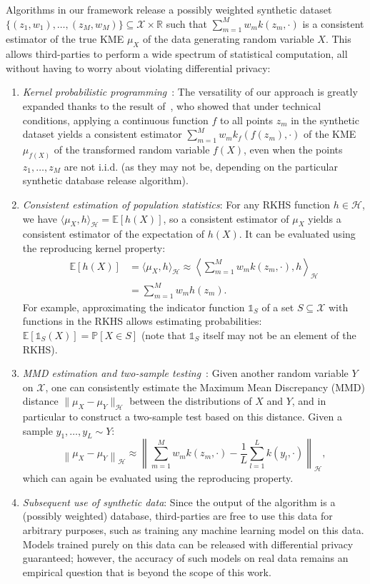 \documentclass{article}
\newcommand{\calH}{\mathcal{H}}			%
\newcommand{\calX}{\mathcal{X}}			%
\newcommand{\IE}{\mathbb{E}}  			%
\newcommand{\IP}{\mathbb{P}}  			%
\newcommand{\IR}{\mathbb{R}}  			%
\theoremstyle{plain}
\theoremstyle{remark}
\theoremstyle{definition}
\begin{document}
Algorithms in our framework release a possibly weighted synthetic dataset $\{ (z_1, w_1), \ldots, (z_M, w_M) \} \subseteq \calX \times \IR$ such that $\sum_{m = 1}^M w_m k(z_m, \cdot)$ is a consistent estimator of the true KME $\mu_X$ of the data generating random variable $X$. This allows third-parties to perform a wide spectrum of statistical computation, all without having to worry about violating differential privacy:
\begin{enumerate}
	\item \emph{Kernel probabilistic programming}~\cite{scholkopf_computing_2015}: The versatility of our approach is greatly expanded thanks to the result of~\cite{scibior_consistent_2016}, who showed that under technical conditions, applying a continuous function $f$ to all points $z_m$ in the synthetic dataset yields a consistent estimator $\sum_{m = 1}^M w_m k_f(f(z_m), \cdot)$ of the KME $\mu_{f(X)}$ of the transformed random variable $f(X)$, even when the points $z_1, \ldots, z_M$ are not i.i.d. (as they may not be, depending on the particular synthetic database release algorithm).
	\item \emph{Consistent estimation of population statistics}: For any RKHS function $h \in \calH$, we have $\langle \mu_X, h \rangle_{\calH} = \IE[h(X)]$, so a consistent estimator of $\mu_X$ yields a consistent estimator of the expectation of $h(X)$. It can be evaluated using the reproducing kernel property:
	\begin{align}
	\IE[h(X)]
	&=
	\langle \mu_X, h \rangle_{\calH}
	\approx
	\left\langle \sum_{m = 1}^M w_m k(z_m, \cdot), h \right\rangle_{\calH}
	\nonumber
	\\&=
	\sum_{m = 1}^M w_m h(z_m)
	.
	\end{align}
	For example, approximating the indicator function $\mathds{1}_S$ of a set $S \subseteq \calX$ with functions in the RKHS allows estimating probabilities: $\IE[ \mathds{1}_S(X) ] = \IP[X \in S]$ (note that $\mathds{1}_S$ itself may not be an element of the RKHS).
	\item \emph{MMD estimation and two-sample testing}~\cite{gretton_kernel_2012}: Given another random variable $Y$ on $\calX$, one can consistently estimate the Maximum Mean Discrepancy (MMD) distance $\| \mu_X - \mu_Y \|_{\calH}$ between the distributions of $X$ and $Y$, and in particular to construct a two-sample test based on this distance. Given a sample $y_1, \ldots, y_L \sim Y$:
	\begin{equation*}
	\left\| \mu_X - \mu_Y \right\|_{\calH}
	\approx
	\left\| \sum_{m = 1}^M w_m k(z_m, \cdot) - \frac{1}{L} \sum_{l = 1}^L k(y_l, \cdot) \right\|_{\calH}
	,
	\end{equation*}
	which can again be evaluated using the reproducing property.
	\item \emph{Subsequent use of synthetic data}: Since the output of the algorithm is a (possibly weighted) database, third-parties are free to use this data for arbitrary purposes, such as training any machine learning model on this data. Models trained purely on this data can be released with differential privacy guaranteed; however, the accuracy of such models on real data remains an empirical question that is beyond the scope of this work.
\end{enumerate}
\end{document}
